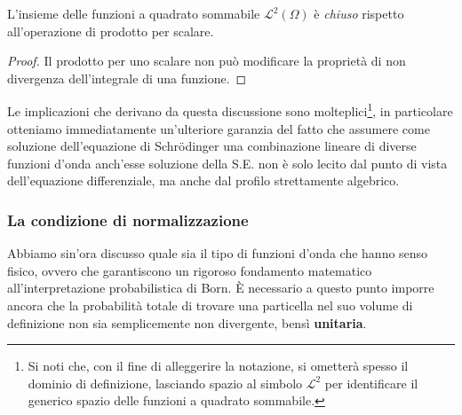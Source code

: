 \begin{proprietà}
    L'insieme delle funzioni a quadrato sommabile $\mathcal{L}^2(\Omega)$ è \emph{chiuso} rispetto all'operazione di prodotto per scalare.
\end{proprietà}
\begin{proof}
    Il prodotto per uno scalare non può modificare la proprietà di non divergenza dell'integrale di una funzione.  
\end{proof}

Le implicazioni che derivano da questa discussione sono molteplici\footnote{Si noti che, con il fine di alleggerire la notazione, si ometterà spesso il dominio di definizione, lasciando spazio al simbolo $\mathcal{L}^2$ per identificare il generico spazio delle funzioni a quadrato sommabile.}, in particolare otteniamo immediatamente un'ulteriore garanzia del fatto che assumere come soluzione dell'equazione di Schrödinger una combinazione lineare di diverse funzioni d'onda anch'esse soluzione della S.E. non è solo lecito dal punto di vista dell'equazione differenziale, ma anche dal profilo strettamente algebrico.

\subsubsection{La condizione di normalizzazione}
Abbiamo sin'ora discusso quale sia il tipo di funzioni d'onda che hanno senso fisico, ovvero che garantiscono un rigoroso fondamento matematico all'interpretazione probabilistica di Born. È necessario a questo punto imporre ancora che la probabilità totale di trovare una particella nel suo volume di definizione non sia semplicemente non divergente, bensì \textbf{unitaria}. 

